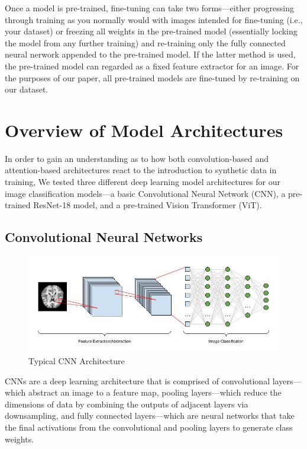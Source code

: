 \documentclass [MS] {uclathes}
\begin{document}
Once a model is pre-trained, fine-tuning can take two forms---either progressing through training as you normally would
with images intended for fine-tuning (i.e., your dataset) or freezing all weights in the pre-trained model (essentially 
locking the model from any further training) and re-training only the fully connected neural nerwork appended to the 
pre-trained model. If the latter method is used, the pre-trained model can regarded as a fixed feature extractor for an 
image. For the purposes of our paper, all pre-trained models are fine-tuned by re-training on our dataset.

\chapter{Overview of Model Architectures}
In order to gain an understanding as to how both convolution-based and attention-based architectures react to the 
introduction to synthetic data in training, We tested three different deep learning model architectures for our image 
classification models---a basic Convolutional Neural Network (CNN), a pre-trained ResNet-18 model, and a pre-trained 
Vision Transformer (ViT).

\section{Convolutional Neural Networks}

\begin{figure}[h]
    \centering
    \includegraphics[width=0.9\linewidth]{figures/CNN-diagram.jpg}
    \caption{Typical CNN Architecture}
    \label{fig:synthetic-mix}
\end{figure}

CNNs are a deep learning architecture that is comprised of convolutional layers---which abstract an image to a feature 
map, pooling layers---which reduce the dimensions of data by combining the outputs of adjacent layers via downsampling, 
and fully connected layers---which are neural networks that take the final activations from the convolutional and 
pooling layers to generate class weights.
\end{document}
